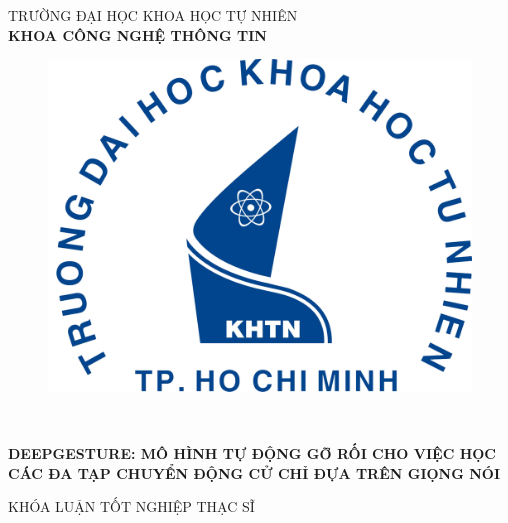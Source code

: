 \begin{titlepage}

\begin{center}
TRƯỜNG ĐẠI HỌC KHOA HỌC TỰ NHIÊN\\
\textbf{KHOA CÔNG NGHỆ THÔNG TIN}\\[2cm]

\begin{figure}[htp]
\centering
\includegraphics[width=8 cm]{images/logo-khtn.png}
{\\[1cm]}
\end{figure}

{ \Large \bfseries \tenSV \\[1cm] } 


 
{ \Large \bfseries
	DEEPGESTURE: MÔ HÌNH TỰ ĐỘNG GỠ RỐI CHO VIỆC HỌC CÁC ĐA TẠP CHUYỂN ĐỘNG CỬ CHỈ ĐỰA TRÊN GIỌNG NÓI  \\[2cm]}
	


\large KHÓA LUẬN TỐT NGHIỆP THẠC SĨ\\



\end{center}
\end{titlepage}
